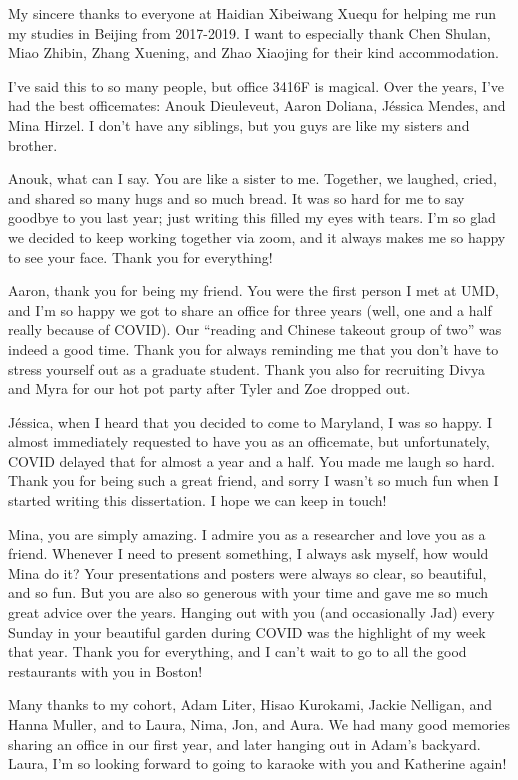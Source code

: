 My sincere thanks to everyone at Haidian Xibeiwang Xuequ for helping me run my studies in Beijing from 2017-2019.  I want to especially thank Chen Shulan, Miao Zhibin, Zhang Xuening, and Zhao Xiaojing for their kind accommodation.
 
I’ve said this to so many people, but office 3416F is magical. Over the years, I’ve had the best officemates: Anouk Dieuleveut, Aaron Doliana, J\'essica Mendes, and Mina Hirzel. I don’t have any siblings, but you guys are like my sisters and brother.
 
Anouk, what can I say. You are like a sister to me. Together, we laughed, cried, and shared so many hugs and so much bread. It was so hard for me to say goodbye to you last year; just writing this filled my eyes with tears. I’m so glad we decided to keep working together via zoom, and it always makes me so happy to see your face. Thank you for everything!
 
Aaron, thank you for being my friend. You were the first person I met at UMD, and I’m so happy we got to share an office for three years (well, one and a half really because of COVID). Our “reading and Chinese takeout group of two” was indeed a good time. Thank you for always reminding me that you don’t have to stress yourself out as a graduate student. Thank you also for recruiting Divya and Myra for our hot pot party after Tyler and Zoe dropped out.

 
J\'essica, when I heard that you decided to come to Maryland, I was so happy. I almost immediately requested to have you as an officemate, but unfortunately, COVID delayed that for almost a year and a half. You made me laugh so hard. Thank you for being such a great friend, and sorry I wasn’t so much fun when I started writing this dissertation. I hope we can keep in touch!
 
Mina, you are simply amazing. I admire you as a researcher and love you as a friend. Whenever I need to present something, I always ask myself, how would Mina do it? Your presentations and posters were always so clear, so beautiful, and so fun. But you are also so generous with your time and gave me so much great advice over the years. Hanging out with you (and occasionally Jad) every Sunday in your beautiful garden during COVID was the highlight of my week that year. Thank you for everything, and I can’t wait to go to all the good restaurants with you in Boston!
 
Many thanks to my cohort, Adam Liter, Hisao Kurokami, Jackie Nelligan, and Hanna Muller, and to Laura, Nima, Jon, and Aura. We had many good memories sharing an office in our first year, and later hanging out in Adam’s backyard. Laura, I’m so looking forward to going to karaoke with you and Katherine again!
 
